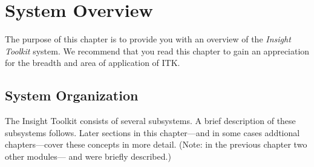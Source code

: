 \chapter{System Overview}
\label{chapter:SystemOverview}

The purpose of this chapter is to provide you with an overview of the
\emph{Insight Toolkit} system. We recommend that you read this chapter to
gain an appreciation for the breadth and area of application of ITK.

\section{System Organization}
\label{sec:SystemOrganization}

The Insight Toolkit consists of several subsystems. A brief
description of these subsystems follows. Later sections in this chapter---and
in some cases addtional chapters---cover these concepts in more detail. (Note:
in the previous chapter two other modules--- and
 were briefly described.)

